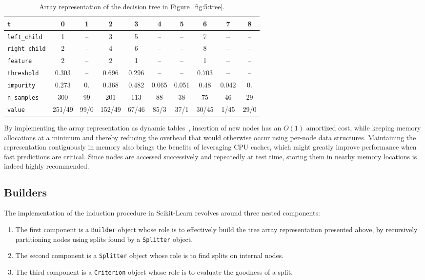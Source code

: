 \begin{table}
    \small
    \hspace{-1.3cm}
    \begin{tabular}{| l | c c c c c c c c c |}
    \hline
    \texttt{t}    & 0 & 1 & 2 & 3 & 4 & 5 & 6 & 7 & 8 \\
    \hline
    \hline
    \texttt{left\_child} & 1 & -- & 3 & 5 & -- & -- & 7 & -- & -- \\
    \texttt{right\_child} & 2 & -- & 4 & 6 & -- & -- & 8 & -- & -- \\
    \texttt{feature} & 2 & -- & 2 & 1 & -- & -- & 1 & -- & -- \\
    \texttt{threshold} & 0.303 & -- & 0.696 & 0.296 & -- & -- & 0.703 & -- & -- \\
    \texttt{impurity} & 0.273 & 0. & 0.368 & 0.482 &  0.065 &  0.051 & 0.48  & 0.042 &  0. \\
    \texttt{n\_samples} & 300 & 99  & 201 & 113  & 88  & 38  & 75  & 46  & 29\\
    \texttt{value} & 251/49 & 99/0 & 152/49 & 67/46 & 85/3 & 37/1 & 30/45 & 1/45 & 29/0 \\
    \hline
    \end{tabular}
    \caption{Array representation of the decision tree in Figure~\ref{fig:5:tree}.}
    \label{table:tree-array}
\end{table}

By implementing the array representation as dynamic tables~\citep{cormen:2001},
insertion of new nodes has an $O(1)$ amortized cost, while keeping memory
allocations at a minimum and thereby reducing the overhead that would otherwise
occur using per-node data structures. Maintaining the representation
contiguously in memory also brings the benefits of leveraging CPU caches,
which might greatly improve performance when fast predictions are critical.
Since nodes are accessed successively and repeatedly at test time,
storing them in nearby memory locations is indeed highly recommended.

\subsection{Builders}

The implementation of the induction procedure in Scikit-Learn revolves around
three nested components:

\begin{enumerate}
\item The first component is a \texttt{Builder} object whose role is to
    effectively build the tree array representation presented above,
    by recursively partitioning nodes using splits found by a \texttt{Splitter} object.

\item The second component is a \texttt{Splitter} object whose role is to find splits on internal nodes.

\item The third component is a \texttt{Criterion} object whose role is to evaluate
    the goodness of a split.
\end{enumerate}


